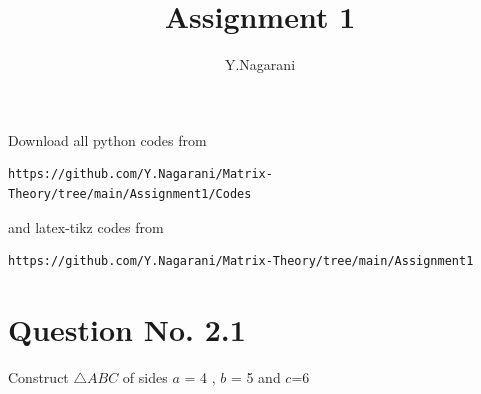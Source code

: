 \documentclass[journal,12pt,twocolumn]{IEEEtran}
\begin{document}
     \def\rightbox#1{\makebox[0in][r]{#1}}
     \def\centbox#1{\makebox[0in]{#1}}
     \def\topbox#1{\raisebox{-\baselineskip}[0in][0in]{#1}}
     \def\midbox#1{\raisebox{-0.5\baselineskip}[0in][0in]{#1}}
\vspace{3cm}
\title{Assignment 1}
\author{Y.Nagarani}
\maketitle
\newpage
\bigskip
\renewcommand{\thefigure}{\theenumi}
\renewcommand{\thetable}{\theenumi}
Download all python codes from 
\begin{lstlisting}
https://github.com/Y.Nagarani/Matrix-Theory/tree/main/Assignment1/Codes
\end{lstlisting}
%
and latex-tikz codes from 
%
\begin{lstlisting}
https://github.com/Y.Nagarani/Matrix-Theory/tree/main/Assignment1
\end{lstlisting}
%
\section{Question No. 2.1}
Construct $\triangle ABC$  of   sides
$a$ = 4 , $b$ = 5  and $c$=6
%
\end{document}

